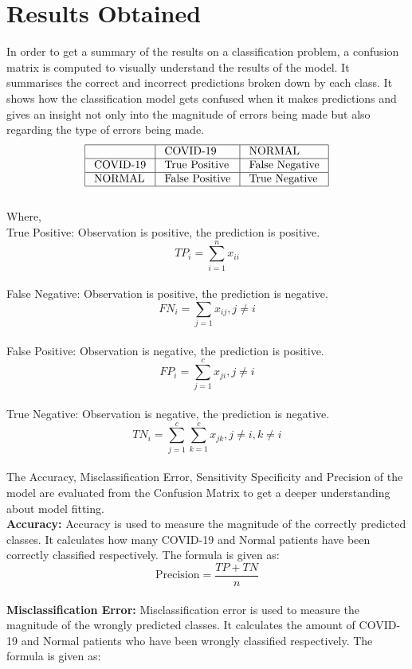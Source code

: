 \documentclass[12pt]{revtex4}
\begin{document}
\section{Results Obtained}
In order to get a summary of the results on a classification problem, a confusion matrix is computed to visually understand the results of the model. It summarises the correct and incorrect predictions broken down by each class. It shows how the classification model gets confused when it makes predictions and gives an insight not only into the magnitude of errors being made but also regarding the type of errors being made. 
$$\begin{array}{|l|l|l|}
\hline & \text { COVID-19 } & \text { NORMAL } \\
\hline \text { COVID-19 } & \text { True Positive } & \text { False Negative } \\
\hline \text { NORMAL } & \text { False Positive } & \text { True Negative } \\
\hline
\end{array}$$
\\Where,
\\True Positive: Observation is positive, the prediction is positive.
$$T P_{i}=\sum_{i=1}^{n} x_{i i}$$
\\False Negative: Observation is positive, the prediction is negative.
$$F N_{i}=\sum_{j=1} x_{i j}, j \neq i$$
\\False Positive: Observation is negative, the prediction is positive.
$$F P_{i}=\sum_{j=1}^{c} x_{j i}, j \neq i$$
\\True Negative: Observation is negative, the prediction is negative.
$$T N_{i}=\sum_{j=1}^{c} \sum_{k=1}^{c} x_{j k}, j \neq i, k \neq i$$
\\The Accuracy, Misclassification Error, Sensitivity Specificity and Precision of the model are evaluated from the Confusion Matrix to get a deeper understanding about model fitting.
\\\textbf{Accuracy: }Accuracy is used to measure the magnitude of the correctly predicted classes. It calculates how many COVID-19 and Normal patients have been correctly classified respectively. The formula is given as:
\begin{equation}\text{Precision}=\frac{T P+T N}{n}\end{equation}
\\\textbf{Misclassification Error: }Misclassification error is used to measure the magnitude of the wrongly predicted classes. It calculates the amount of COVID-19 and Normal patients who have been wrongly classified respectively. The formula is given as:
\end{document}
